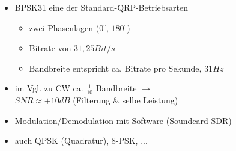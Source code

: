 \begin{frame}
    \begin{columns}[c]
        \column[c]{8cm}
            \begin{itemize}
                \item BPSK31 eine der Standard-QRP-Betriebsarten
                \begin{itemize}
                    \item zwei Phasenlagen ($0^{\circ}$, $180^{\circ}$)
                    \item Bitrate von $31,25 Bit/s$
                    \item Bandbreite entspricht ca. Bitrate pro Sekunde, $31Hz$
                \end{itemize}
                \item im Vgl. zu CW ca. $\frac{1}{10}$ Bandbreite $\rightarrow$ \\
                      $SNR \approx +10dB$ (Filterung \& selbe Leistung)
                \item Modulation/Demodulation mit Software (Soundcard SDR)
                \item auch QPSK (Quadratur), 8-PSK, ...
            \end{itemize}
        \column{2cm}
        \begin{center}

\end{center}
\end{columns}
\end{frame}
